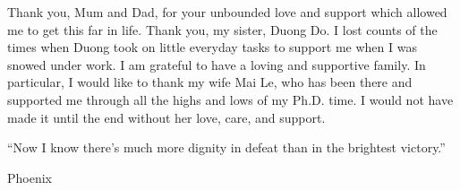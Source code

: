 \begin{acknowledgements}
    
    Thank you, Mum and Dad, for your unbounded love and support which allowed me to get this far in life. Thank you, my sister, Duong Do. I lost counts of the times when Duong took on little everyday tasks to support me when I was snowed under work. I am grateful to have a loving and supportive family. In particular, I would like to thank my wife Mai Le, who has been there and supported me through all the highs and lows of my Ph.D. time. I would not have made it until the end without her love, care, and support. 

\epigraph{``Now I know there's much more dignity
    in defeat than in the brightest victory.''}{Phoenix}


\end{acknowledgements}